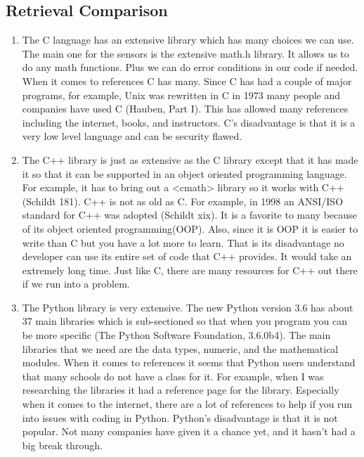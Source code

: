 \documentclass[10pt,draftclsnofoot,onecolumn]{IEEEtran}
\begin{document}
   \subsection{Retrieval Comparison}
   \begin{enumerate}
   \item
    The C language has an extensive library which has many choices we can use.  The main one for the sensors is the extensive math.h library.  It allows us to do any math functions. Plus we can do error conditions in our code if needed.  When it comes to references C has many.  Since C has had a couple of major programs, for example, Unix was rewritten in C in 1973 many people and companies have used C (Hauben, Part I).  This has allowed many references including the internet, books, and instructors. C’s disadvantage is that it is a very low level language and can be security flawed.\\
   \item
    The C++ library is just as extensive as the C library except that it has made it so that it can be supported in an object oriented programming language.  For example, it has to bring out a <cmath> library so it works with C++ (Schildt 181).  C++ is not as old as C. For example, in 1998 an ANSI/ISO standard for C++ was adopted (Schildt xix).  It is a favorite to many because of its object oriented programming(OOP).  Also, since it is OOP it is easier to write than C but you have a lot more to learn. That is its disadvantage no developer can use its entire set of code that C++ provides.  It would take an extremely long time. Just like C, there are many resources for C++ out there if we run into a problem.\\
   \item
   The Python library is very extensive.  The new Python version 3.6 has about 37 main libraries which is sub-sectioned so that when you program you can be more specific (The Python Software Foundation, 3.6.0b4).  The main libraries that we need are the data types, numeric, and the mathematical modules.  When it comes to references it seems that Python users understand that many schools do not have a class for it.  For example, when I was researching the libraries it had a reference page for the library.  Especially when it comes to the internet, there are a lot of references to help if you run into issues with coding in Python. Python’s disadvantage is that it is not popular.  Not many companies have given it a chance yet, and it hasn’t had a big break through.  
   \end {enumerate}
\end{document}
